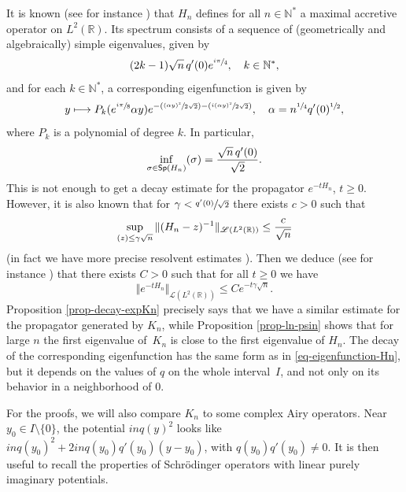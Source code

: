 \documentclass[JEP,XML,SOM,Unicode]{cedram}
\let\mathcal\mathscr
\def\mto{\mathchoice{\longmapsto}{\mapsto}{\mapsto}{\mapsto}}
\newcommand{\Psfrac}[2]{(\sfrac{#1}{#2})}
\theoremstyle{plain}
\theoremstyle{definition}
\newcommand{\nr}[1]{\Vert #1\Vert}
\newcommand{\set}[1]{\{ #1\}}
\newcommand{\inv}{^{-1}}
\newcommand{\1}{\mathds 1}
\let\Re\relax
\DeclareMathOperator{\Re}{\mathsf{Re}\mkern2mu}
\newcommand{\Sp}{\mathsf{Sp}}
\newcommand{\R}{\mathbb{R}}
\newcommand{\N}{\mathbb{N}}
\let\a\alpha
\let\g\gamma
\let\s\sigma
\newcommand{\Lc}{{\mathcal L}}
\begin{document}
It is known (see for instance \cite[\S 14.4]{helffer}) that $H_n$ defines for all $n \in \N^*$ a maximal accretive operator on $L^2(\R)$. Its spectrum consists of a sequence of (geometrically and algebraically) simple eigenvalues, given by
\[
(2k - 1) \sqrt n\, q'(0) e^{\sfrac {i\pi}4} , \quad k \in \N^*,
\]
and for each $k \in \N^*$, a corresponding eigenfunction is given by
\begin{equation} \label{eq-eigenfunction-Hn}
y \mto P_k(e^{\sfrac {i\pi}8} \a y) e^{- \Psfrac {(\a y)^2}{2\sqrt 2} - \Psfrac {i(\a y)^2}{2\sqrt 2}}, \quad \a = n^{\sfrac 14} q'(0)^{\sfrac 12},
\end{equation}
where $P_k$ is a polynomial of degree $k$. In particular,
\[
\inf_{\s \in \Sp(H_n)} \Re(\s) = \frac {\sqrt n\,q'(0)}{\sqrt 2}.
\]
This is not enough to get a decay estimate for the propagator $e^{-t H_n}$, $t \geq 0$. However, it is also known that for $\gamma < \sfrac {q'(0)}{\sqrt 2}$ there exists $c > 0$ such that
\begin{equation} \label{estim-Hn-resolvent}
\sup_{\Re(z) \leq \g \sqrt n} \nr{(H_n-z)\inv}_{\Lc(L^2(\R))} \leq \frac {c}{\sqrt n}
\end{equation}
(in fact we have more precise resolvent estimates \cite{HitrikSjoVio13,KrejcirikSieTatVio15}). Then we deduce (see for instance \cite[Th. V.1.11]{engel}) that there exists $C > 0$ such that for all $t \geq 0$ we have
\begin{equation} \label{estim-Hn-propagator}
\nr{e^{-tH_n}}_{\Lc(L^2(\R))} \leq C e^{-t\gamma \sqrt n}.
\end{equation}
Proposition \ref{prop-decay-expKn} precisely says that we have a similar estimate for the propagator generated by $K_n$, while Proposition \ref{prop-ln-psin} shows that for large $n$ the first eigenvalue of~$K_n$ is close to the first eigenvalue of $H_n$. The decay of the corresponding eigenfunction has the same form as in \eqref{eq-eigenfunction-Hn}, but it depends on the values of $q$ on the whole interval~$I$, and not only on its behavior in a neighborhood of 0.

For the proofs, we will also compare $K_n$ to some complex Airy operators. Near $y_0 \in I \setminus \set 0$, the potential $in q(y)^2$ looks like $inq(y_0)^2 + 2in q(y_0) q'(y_0) (y-y_0)$, with $q(y_0) q'(y_0) \neq 0$. It is then useful to recall the properties of Schrödinger operators with linear purely imaginary potentials.
\end{document}
